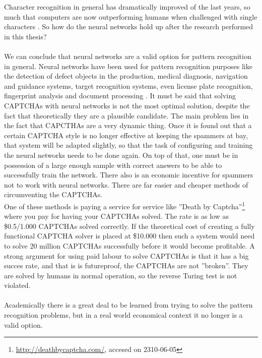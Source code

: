 \documentclass[pdftex,a4paper,12pt,twoside]{report}
\theoremstyle{plain} \newtheorem{theorem}{Theorem} \newtheorem{proposition}{Proposition} \newtheorem{lemma}{Lemma} \newtheorem*{corollary}{Corollary}
\theoremstyle{definition} \newtheorem{definition}{Definition} \newtheorem{conjecture}{Conjecture} \newtheorem*{example}{Example} \newtheorem{algorithm}{Algorithm}
\theoremstyle{remark} \newtheorem*{remark}{Remark} \newtheorem*{note}{Note} \newtheorem{case}{Case}
\begin{document}
Character recognition in general has dramatically improved of the last years, so much that computers are now outperforming humans when challenged with single characters \citep{Chellapilla2005}. So how do the neural networks hold up after the research performed in this thesis?\\\\We can conclude that neural networks are a valid option for pattern recognition in general. Neural networks have been used for pattern recognition purposes like the detection of defect objects in the production, medical diagnosis, navigation and guidance systems, target recognition systems, even license plate recognition, fingerprint analysis and document processing \citep{Egmont-Petersen2002}. It must be said that solving CAPTCHAs with neural networks is not the most optimal solution, despite the fact that theoretically they are a plausible candidate. The main problem lies in the fact that CAPCTHAs are a very dynamic thing. Once it is found out that a certain CAPTCHA style is no longer effective at keeping the spammers at bay, that system will be adapted slightly, so that the task of configuring and training the neural networks needs to be done again. On top of that, one must be in possession of a large enough sample with correct answers to be able to successfully train the network. There also is an economic incentive for spammers not to work with neural networks. There are far easier and cheaper methods of circumventing the CAPTCHAs.\\One of these methods is paying a service for service like ''Death by Captcha''\footnote{\url{http://deathbycaptcha.com/}, accesed on 2310-06-05} where you pay for having your CAPTCHAs solved. The rate is as low as \$0.5/1.000 CAPTCHAs solved correctly. If the theoretical cost of creating a fully functional CAPTCHA solver is placed at \$10.000 then such a system would need to solve 20 million CAPTCHAs successfully before it would become profitable. A strong argument for using paid labour to solve CAPTCHAs is that it has a big succes rate, and that is is futureproof, the CAPTCHAs are not ''broken''. They are solved by humans in normal operation, so the reverse Turing test is not violated.\\\\Academically there is a great deal to be learned from trying to solve the pattern recognition problems, but in a real world economical context it no longer is a valid option.
%
%
\end{document}
